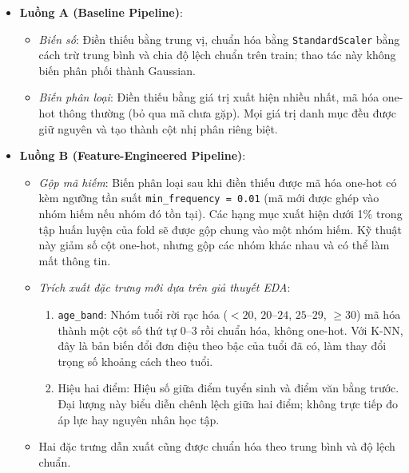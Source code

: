 \begin{itemize}
    \item \textbf{Luồng A (Baseline Pipeline)}:
    \begin{itemize}
        \item \emph{Biến số}: Điền thiếu bằng trung vị, chuẩn hóa bằng \texttt{StandardScaler} bằng cách trừ trung bình và chia độ lệch chuẩn trên train; thao tác này không biến phân phối thành Gaussian.
        \item \emph{Biến phân loại}: Điền thiếu bằng giá trị xuất hiện nhiều nhất, mã hóa one-hot thông thường (bỏ qua mã chưa gặp). Mọi giá trị danh mục đều được giữ nguyên và tạo thành cột nhị phân riêng biệt.
    \end{itemize}
    \item \textbf{Luồng B (Feature-Engineered Pipeline)}:
    \begin{itemize}
        \item \emph{Gộp mã hiếm}: Biến phân loại sau khi điền thiếu được mã hóa one-hot có kèm ngưỡng tần suất \texttt{min\_frequency = 0.01} (mã mới được ghép vào nhóm hiếm nếu nhóm đó tồn tại). Các hạng mục xuất hiện dưới 1\% trong tập huấn luyện của fold sẽ được gộp chung vào một nhóm hiếm. Kỹ thuật này giảm số cột one-hot, nhưng gộp các nhóm khác nhau và có thể làm mất thông tin.
        \item \emph{Trích xuất đặc trưng mới dựa trên giả thuyết EDA}:
        \begin{enumerate}
            \item \texttt{age\_band}: Nhóm tuổi rời rạc hóa ($<20$, $20$--$24$, $25$--$29$, $\ge 30$) mã hóa thành một cột số thứ tự 0--3 rồi chuẩn hóa, không one-hot. Với K-NN, đây là bản biến đổi đơn điệu theo bậc của tuổi đã có, làm thay đổi trọng số khoảng cách theo tuổi.
            \item Hiệu hai điểm: Hiệu số giữa điểm tuyển sinh và điểm văn bằng trước. Đại lượng này biểu diễn chênh lệch giữa hai điểm; không trực tiếp đo áp lực hay nguyên nhân học tập.
        \end{enumerate}
        \item Hai đặc trưng dẫn xuất cũng được chuẩn hóa theo trung bình và độ lệch chuẩn.
    \end{itemize}
\end{itemize}

